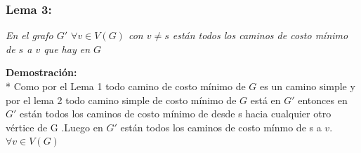 \documentclass{article}
\begin{document}
    \vspace*{0.5cm} 

    \subsubsection{Lema 3:}
    
    \textit{En el grafo $G'$ $\forall v \in V(G) $ con $v\neq s$  est\'an todos los caminos de costo m\'inimo de $s$ a $v$ que hay en $G$}
    
    \vspace*{0.3cm} 
     
    \noindent \textbf{Demostraci\'on:}
    \\*
    Como por el Lema 1 todo  camino de costo m\'inimo de $G$ es un camino simple y por el lema 2 todo camino simple de
    costo m\'inimo  de $G$ est\'a en $G'$ entonces en $G'$ est\'an  todos los caminos de costo m\'inimo de desde s hacia 
    cualquier otro v\'ertice de G .Luego en $G'$  est\'an todos los caminos de costo m\'inmo de s a $v$. 
    $\forall v\in V(G)$

     
\end{document}
